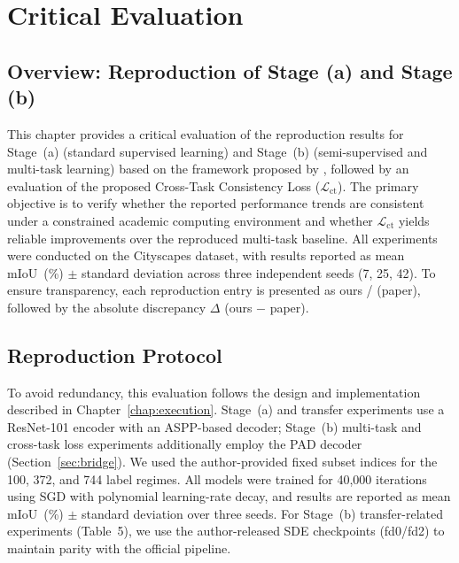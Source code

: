 \chapter{Critical Evaluation}
\label{chap:evaluation}

\section{Overview: Reproduction of Stage (a) and Stage (b)}
\label{sec:repro_overview}

\noindent
This chapter provides a critical evaluation of the reproduction results
for Stage~(a) (standard supervised learning) and Stage~(b)
(semi-supervised and multi-task learning) based on the framework proposed
by \cite{hoyer2023ijcv_sde}, followed by an evaluation of the proposed
Cross-Task Consistency Loss ($\mathcal{L}_\text{ct}$). The primary
objective is to verify whether the reported performance trends are
consistent under a constrained academic computing environment and whether
$\mathcal{L}_\text{ct}$ yields reliable improvements over the reproduced
multi-task baseline. All experiments were conducted on the Cityscapes
dataset, with results reported as mean mIoU~(\%) $\pm$ standard deviation
across three independent seeds (7, 25, 42). To ensure transparency, each
reproduction entry is presented as ours / (paper), followed by the
absolute discrepancy $\Delta$ (ours $-$ paper).

\section{Reproduction Protocol}
\label{sec:repro_protocol}

\noindent
To avoid redundancy, this evaluation follows the design and implementation
described in Chapter~\ref{chap:execution}. Stage~(a) and transfer
experiments use a ResNet-101 encoder with an ASPP-based decoder;
Stage~(b) multi-task and cross-task loss experiments additionally employ
the PAD decoder (Section~\ref{sec:bridge}). We used the author-provided
fixed subset indices for the 100, 372, and 744 label regimes. All models
were trained for 40,000 iterations using SGD with polynomial
learning-rate decay, and results are reported as mean mIoU~(\%) $\pm$
standard deviation over three seeds. For Stage~(b) transfer-related
experiments (Table~5), we use the author-released SDE checkpoints
(fd0/fd2) to maintain parity with the official pipeline.

